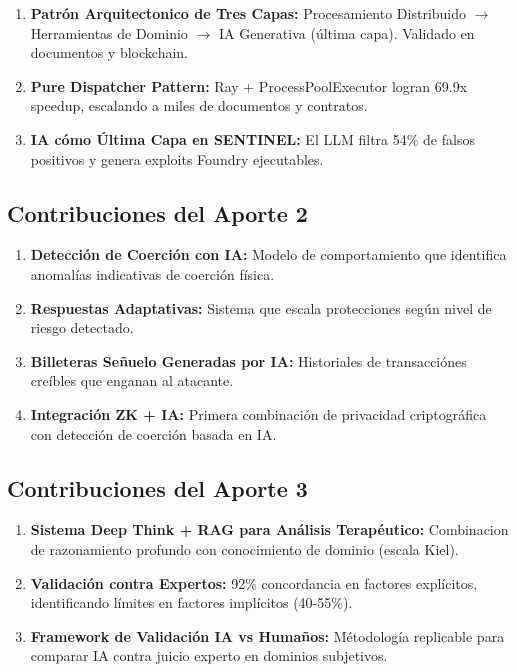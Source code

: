 \documentclass[12pt,a4paper,twoside]{book}
\begin{document}
\begin{enumerate}
    \item \textbf{Patrón Arquitectonico de Tres Capas:} Procesamiento Distribuido $\rightarrow$ Herramientas de Dominio $\rightarrow$ IA Generativa (última capa). Validado en documentos y blockchain.
    
    \item \textbf{Pure Dispatcher Pattern:} Ray + ProcessPoolExecutor logran 69.9x speedup, escalando a miles de documentos y contratos.
    
    \item \textbf{IA cómo Última Capa en SENTINEL:} El LLM filtra 54\% de falsos positivos y genera exploits Foundry ejecutables.
\end{enumerate}

\subsection{Contribuciones del Aporte 2}

\begin{enumerate}
    \item \textbf{Detección de Coerción con IA:} Modelo de comportamiento que identifica anomalías indicativas de coerción física.
    
    \item \textbf{Respuestas Adaptativas:} Sistema que escala protecciones según nivel de riesgo detectado.
    
    \item \textbf{Billeteras Señuelo Generadas por IA:} Historiales de transacciónes creíbles que enganan al atacante.
    
    \item \textbf{Integración ZK + IA:} Primera combinación de privacidad criptográfica con detección de coerción basada en IA.
\end{enumerate}

\subsection{Contribuciones del Aporte 3}

\begin{enumerate}
    \item \textbf{Sistema Deep Think + RAG para Análisis Terapéutico:} Combinacion de razonamiento profundo con conocimiento de dominio (escala Kiel).
    
    \item \textbf{Validación contra Expertos:} 92\% concordancia en factores explícitos, identificando límites en factores implícitos (40-55\%).
    
    \item \textbf{Framework de Validación IA vs Humaños:} Métodología replicable para comparar IA contra juicio experto en dominios subjetivos.
\end{enumerate}
\end{document}
